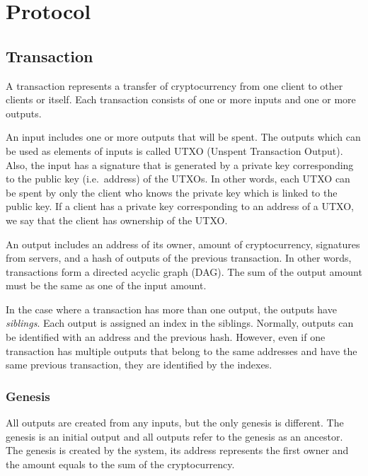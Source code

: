 \documentclass[a4paper, oneside]{discothesis}
\begin{document}
\section{Protocol}

\subsection{Transaction}
A transaction represents a transfer of cryptocurrency from one client to other clients or itself.
Each transaction consists of one or more inputs and one or more outputs.

An input includes one or more outputs that will be spent.
The outputs which can be used as elements of inputs is called UTXO (Unspent Transaction Output).
Also, the input has a signature that is generated by a private key
corresponding to the public key (i.e.\ address) of the UTXOs.
In other words, each UTXO can be spent by only the client who knows the private
key which is linked to the public key.
If a client has a private key corresponding to an address of a UTXO,
we say that the client has ownership of the UTXO.

An output includes an address of its owner, amount of cryptocurrency, signatures from servers,
and a hash of outputs of the previous transaction.
In other words, transactions form a directed acyclic graph (DAG).
The sum of the output amount must be the same as one of the input amount.

In the case where a transaction has more than one output, the outputs have \emph{siblings}.
Each output is assigned an index in the siblings.
Normally, outputs can be identified with an address and the previous hash.
However, even if one transaction has multiple outputs that belong to the same addresses
and have the same previous transaction, they are identified by the indexes.


\subsubsection{Genesis}
All outputs are created from any inputs, but the only genesis is different.
The genesis is an initial output and all outputs refer to the genesis as an ancestor.
The genesis is created by the system, its address represents the first owner
and the amount equals to the sum of the cryptocurrency.
\end{document}
